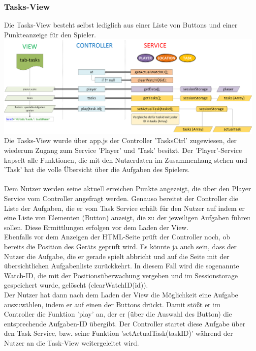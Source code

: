 \subsubsection{Tasks-View}
%
%
Die Tasks-View besteht selbst lediglich aus einer Liste von Buttons und einer Punkteanzeige für den Spieler.
%
%
\\ \includegraphics[width=1\textwidth]{ref/images/04-tasks-tab.png} \\
%
%
Die Tasks-View wurde über app.js der Controller 'TasksCtrl' zugewiesen, der wiederum Zugang zum Service 'Player' und 'Task' besitzt. Der 'Player'-Service kapselt alle Funktionen, die mit den Nutzerdaten im Zusammenhang stehen und 'Task' hat die volle Übersicht über die Aufgaben des Spielers.
\\
\\
Dem Nutzer werden seine aktuell erreichen Punkte angezeigt, die über den Player Service vom Controller angefragt werden. Genauso bereitet der Controller die Liste der Aufgaben, die er vom Task Service erhält für den Nutzer auf indem er eine Liste von Elementen (Button) anzeigt, die zu der jeweiligen Aufgaben führen sollen. Diese Ermittlungen erfolgen vor dem Laden der View.
\\
Ebenfalls vor dem Anzeigen der HTML-Seite prüft der Controller noch, ob bereits die Position des Geräts geprüft wird. Es könnte ja auch sein, dass der Nutzer die Aufgabe, die er gerade spielt abbricht und auf die Seite mit der übersichtlichen Aufgabenliste zurückkehrt. In diesem Fall wird die sogenannte Watch-ID, die mit der Positionsüberwachung vergeben und im Sessionstorage gespeichert wurde, gelöscht (clearWatchID(id)).
\\
Der Nutzer hat dann nach dem Laden der View die Möglichkeit eine Aufgabe auszuwählen, indem er auf einen der Buttons drückt. Damit stößt er im Controller die Funktion 'play' an, der er (über die Auswahl des Button) die entsprechende Aufgaben-ID übergibt. Der Controller startet diese Aufgabe über den Task Service, bzw. seine Funktion 'setActualTask(taskID)' während der Nutzer an die Task-View weitergeleitet wird.

